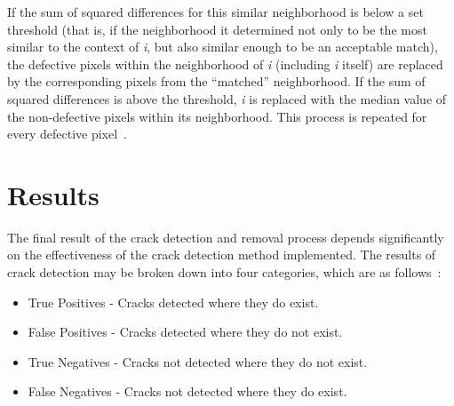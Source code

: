 \documentclass{sig-alternate}
\begin{document}
If the sum of squared differences for this similar neighborhood is below a set threshold (that is, if the neighborhood it determined not only to be the most similar to the context of \textit{i}, but also similar enough to be an acceptable match), the defective pixels within the neighborhood of \textit{i} (including \textit{i} itself) are replaced by the corresponding pixels from the ``matched'' neighborhood. If the sum of squared differences is above the threshold, \textit{i} is replaced with the median value of the non-defective pixels within its neighborhood. This process is repeated for every defective pixel~\cite{TopHat:2010}.

\section{Results}\label{results}
The final result of the crack detection and removal process depends significantly on the effectiveness of the crack detection method implemented. The results of crack detection may be broken down into four categories, which are as follows~\cite{Statistics:2013}:
\begin{itemize}
\item True Positives - Cracks detected where they do exist.
\item False Positives - Cracks detected where they do not exist.
\item True Negatives - Cracks not detected where they do not exist.
\item False Negatives - Cracks not detected where they do exist.
\end{itemize}
\end{document}
